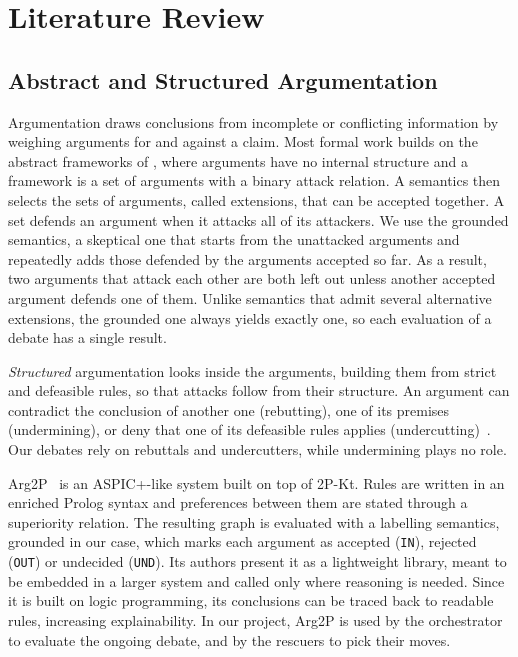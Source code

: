 \section{Literature Review}\label{sec:lit_rev}

\subsection{Abstract and Structured Argumentation}

Argumentation draws conclusions from incomplete or conflicting information by weighing arguments for and against a claim.
Most formal work builds on the abstract frameworks of \citet{dung1995}, where arguments have no internal structure and a framework is a set of arguments with a binary attack relation.
A semantics then selects the sets of arguments, called extensions, that can be accepted together.
A set defends an argument when it attacks all of its attackers.
We use the grounded semantics, a skeptical one that starts from the unattacked arguments and repeatedly adds those defended by the arguments accepted so far.
As a result, two arguments that attack each other are both left out unless another accepted argument defends one of them.
Unlike semantics that admit several alternative extensions, the grounded one always yields exactly one, so each evaluation of a debate has a single result.

\emph{Structured} argumentation looks inside the arguments, building them from strict and defeasible rules, so that attacks follow from their structure.
An argument can contradict the conclusion of another one (rebutting), one of its premises (undermining), or deny that one of its defeasible rules applies (undercutting)~\citep{modgil2014aspic}.
Our debates rely on rebuttals and undercutters, while undermining plays no role.

Arg2P~\citep{calegari2022arg2p} is an ASPIC+-like system built on top of 2P-Kt.
Rules are written in an enriched Prolog syntax and preferences between them are stated through a superiority relation.
The resulting graph is evaluated with a labelling semantics, grounded in our case, which marks each argument as accepted (\texttt{IN}), rejected (\texttt{OUT}) or undecided (\texttt{UND}).
Its authors present it as a lightweight library, meant to be embedded in a larger system and called only where reasoning is needed.
Since it is built on logic programming, its conclusions can be traced back to readable rules, increasing explainability.
In our project, Arg2P is used by the orchestrator to evaluate the ongoing debate, and by the rescuers to pick their moves.


